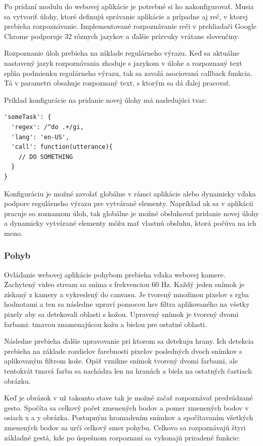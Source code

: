 Po pridaní modulu do webovej aplikácie je potrebné si ho nakonfigurovať. Musia sa vytvoriť úlohy, ktoré definujú správanie aplikácie a prípadne aj reč, v ktorej prebieha rozpoznávanie. Implementované rozpoznávanie reči v prehliadači Google Chrome podporuje 32 rôznych jazykov a ďalšie prízvuky vrátane slovenčiny.

Rozpoznanie úloh prebieha na základe regulárneho výrazu. Keď sa aktuálne nastavený jazyk rozpoznávania zhoduje s jazykom v úlohe a rozpoznaný text spĺňa podmienku regulárneho výrazu, tak sa zavolá asociovaná callback funkcia. Tá v parametri obsahuje rozpoznaný text, s ktorým sa dá ďalej pracovať. 

Príklad konfigurácie na pridanie novej úlohy má nasledujúci tvar:

\begin{verbatim}
'someTask': {
  'regex': /^do .+/gi,
  'lang': 'en-US',
  'call': function(utterance){
    // DO SOMETHING
  }
}
\end{verbatim}

Konfiguráciu je možné zavolať globálne v rámci aplikácie alebo dynamicky vďaka podpore regulárneho výrazu pre vytvárané elementy. Napríklad ak sa v aplikácii pracuje so zoznamom úloh, tak globálne je možné obsluhovať pridanie novej úlohy a dynamicky vytvárané elementy môžu mať vlastnú obsluhu, ktorá počúva na ich meno.



\subsubsection{Pohyb} %
\label{ssub:pohyb}

Ovládanie webovej aplikácie pohybom prebieha vďaka webovej kamere. Zachytený video stream sa sníma s frekvenciou 60 Hz. Každý jeden snímok je získaný z kamery a vykreslený do canvasu. Je tvorený množinou pixelov s rgba hodnotami a ten sa následne upraví pomocou hsv filtra aplikovaného na všetky pixely aby sa detekovali oblasti s kožou. Upravený snímok je tvorený dvomi farbami: tmavou znamenajúcou kožu a bielou pre ostatné oblasti.

Následne prebieha ďalšie upravovanie pri ktorom sa detekuju hrany. Ich detekcia prebieha na základe rozdielov farebnosti pixelov posledných dvoch snímkov s aplikovaným filtrom kože. Opäť vznikne snímok tvorený dvomi farbami, ale tentokrát tmavá farba sa nachádza len na hranách a biela na ostatných častiach obrázku.

Keď je obrázok v už takomto stave tak je možné začať rozpoznávať predvádzané gesto. Spočíta sa celkový počet zmenených bodov a pomer zmenených bodov v osiach x a y obrázka. Postupným hromadením snímkov a spočítavaním všetkých zmenených bodov sa určí celkový smer pohybu. Celkovo sa rozpoznávajú štyri základné gestá, kde po úspešnom rozpoznaní sa vykonajú priradené funkcie:

